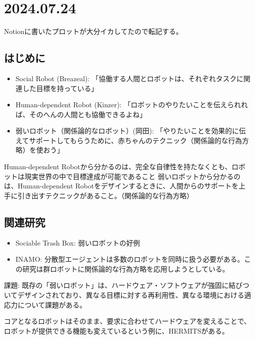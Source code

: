 \documentclass[twocolumn]{mynote}
\begin{document}
\section{2024.07.24}

Notionに書いたプロットが大分イカしてたので転記する。

\subsection{はじめに}
\begin{itemize}
  \item Social Robot (Breazeal)\cite{Breazeal-2004-SocialInteractionsHRIRobot}: 「協働する人間とロボットは、それぞれタスクに関連した目標を持っている」
  \item Human-dependent Robot (Kinzer)\cite{--TweenbotsKacieKinzer}: 「ロボットのやりたいことを伝えられれば、そのへんの人間とも協働できるよね」
  \item 弱いロボット（関係論的なロボット）(岡田)\cite{岡田美智男-2012-ゴミ箱ロ}: 「やりたいことを効果的に伝えてサポートしてもらうために、赤ちゃんのテクニック（関係論的な行為方略）を使おう」
\end{itemize}
Human-dependent Robotから分かるのは、完全な自律性を持たなくとも、ロボットは現実世界の中で目標達成が可能であること
弱いロボットから分かるのは、Human-dependent Robotをデザインするときに、人間からのサポートを上手に引き出すテクニックがあること。（関係論的な行為方略）

\subsection{関連研究}
\begin{itemize}
  \item Sociable Trash Box\cite{Yamaji-2010-STBHumandependentSociableTrash}: 弱いロボットの好例
  \item INAMO\cite{岡田美智男-2012-ゴミ箱ロ}: 分散型エージェントは多数のロボットを同時に扱う必要がある。この研究は群ロボットに関係論的な行為方略を応用しようとしている。
\end{itemize}

課題: 既存の「弱いロボット」は、ハードウェア・ソフトウェアが強固に結びついてデザインされており、異なる目標に対する再利用性、異なる環境における適応力について課題がある。

コアとなるロボットはそのまま、要求に合わせてハードウェアを変えることで、ロボットが提供できる機能も変えているという例に、HERMITS\cite{Group-2020-HERMITS}がある。
\end{document}
